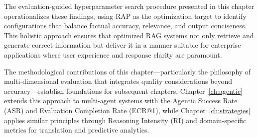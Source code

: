 The evaluation-guided hyperparameter search procedure presented in this chapter operationalizes these findings, using RAP as the optimization target to identify configurations that balance factual accuracy, relevance, and output conciseness. This holistic approach ensures that optimized RAG systems not only retrieve and generate correct information but deliver it in a manner suitable for enterprise applications where user experience and response clarity are paramount.

The methodological contributions of this chapter---particularly the philosophy of multi-dimensional evaluation that integrates quality considerations beyond accuracy---establish foundations for subsequent chapters. Chapter~\ref{ch:agentic} extends this approach to multi-agent systems with the Agentic Success Rate (ASR) and Evaluation Completion Rate (ECR@1), while Chapter~\ref{ch:strategies} applies similar principles through Reasoning Intensity (RI) and domain-specific metrics for translation and predictive analytics.